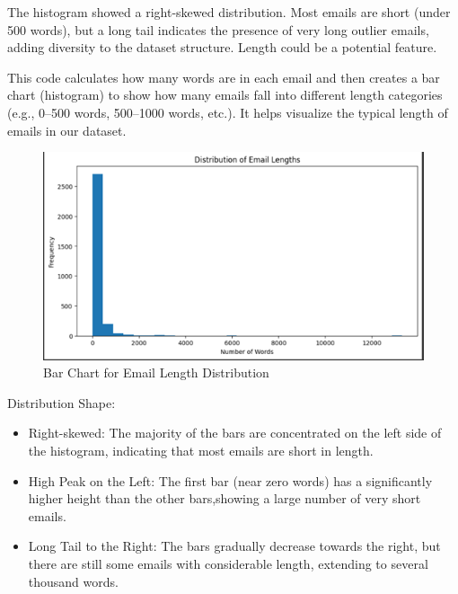 The histogram showed a right-skewed distribution.
Most emails are short (under 500 words), but a long tail indicates the presence of very long outlier emails, adding diversity to the dataset structure.
Length could be a potential feature.

This code calculates how many words are in each email and then creates a bar chart (histogram) to show how many emails fall into different length categories (e.g., 0–500 words, 500–1000 words, etc.). It helps visualize the typical length of emails in our dataset.

\begin{figure}[H]
    \centering
    \includegraphics[width=\linewidth]{images/email_length_distribution}
    \caption{Bar Chart for Email Length Distribution}
    \label{fig:email_length_distribution}
\end{figure}

Distribution Shape:
\begin{itemize}
    \item Right-skewed: The majority of the bars are concentrated on the left side of the histogram, indicating that most emails are short in length.
    \item High Peak on the Left: The first bar (near zero words) has a significantly higher height than the other bars,showing a large number of very short emails.
    \item Long Tail to the Right: The bars gradually decrease towards the right, but there are still some emails with considerable length, extending to several thousand words.
\end{itemize}

